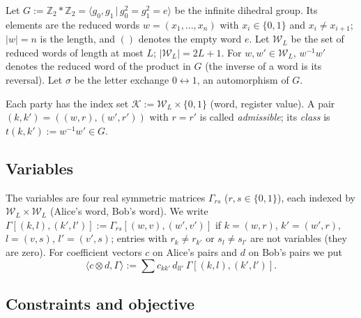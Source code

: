 \documentclass[aps,pra,onecolumn,notitlepage,superscriptaddress,longbibliography,nofootinbib,11pt]{revtex4-2}
\theoremstyle{remark}
\newcommand{\ZZ}{\mathbb{Z}}
\newcommand{\cW}{\mathcal{W}}
\newcommand{\cK}{\mathcal{K}}
\begin{document}
Let $G:=\ZZ_2*\ZZ_2=\langle g_0,g_1\,|\,g_0^2=g_1^2=e\rangle$ be the infinite dihedral group. Its elements are the reduced words $w=(x_1,\dots,x_n)$ with $x_i\in\{0,1\}$ and $x_i\neq x_{i+1}$; $|w|=n$ is the length, and $()$ denotes the empty word $e$. Let $\cW_L$ be the set of reduced words of length at most $L$; $|\cW_L|=2L+1$. For $w,w'\in\cW_L$, $w^{-1}w'$ denotes the reduced word of the product in $G$ (the inverse of a word is its reversal). Let $\sigma$ be the letter exchange $0\leftrightarrow1$, an automorphism of $G$.

Each party has the index set $\cK:=\cW_L\times\{0,1\}$ (word, register value). A pair $(k,k')=((w,r),(w',r'))$ with $r=r'$ is called \emph{admissible}; its \emph{class} is $t(k,k'):=w^{-1}w'\in G$.

\subsection{Variables}

The variables are four real symmetric matrices $\Gamma_{rs}$ ($r,s\in\{0,1\}$), each indexed by $\cW_L\times\cW_L$ (Alice's word, Bob's word). We write $\Gamma[(k,l),(k',l')]:=\Gamma_{rs}[(w,v),(w',v')]$ if $k=(w,r)$, $k'=(w',r)$, $l=(v,s)$, $l'=(v',s)$; entries with $r_k\neq r_{k'}$ or $s_l\neq s_{l'}$ are not variables (they are zero). For coefficient vectors $c$ on Alice's pairs and $d$ on Bob's pairs we put
\begin{equation}
\langle c\otimes d,\Gamma\rangle:=\sum c_{kk'}\,d_{ll'}\,\Gamma[(k,l),(k',l')] .
\end{equation}

\subsection{Constraints and objective}
\end{document}
